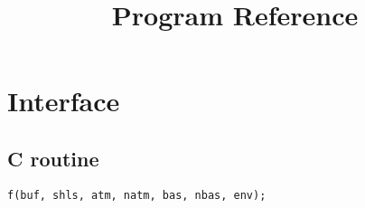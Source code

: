 \documentclass{article}
\title{Program Reference}
\begin{document}
\maketitle

\tableofcontents

\section{Interface}

\subsection{C routine}

\begin{verbatim}
f(buf, shls, atm, natm, bas, nbas, env);
\end{verbatim}
\end{document}
